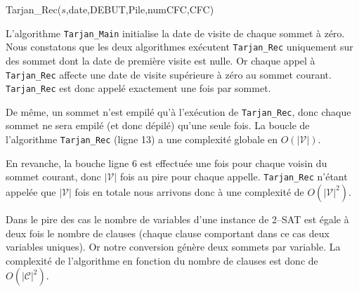 \begin{enumerate}[(a)]
\begin{algorithm}[H]
  \caption{Tarjan\_Rec($s$,date,DEBUT,Pile,numCFC,CFC)}
\end{algorithm}

L'algorithme \texttt{Tarjan\_Main} initialise la date de visite de chaque sommet à zéro. Nous constatons que les deux algorithmes exécutent \texttt{Tarjan\_Rec} uniquement sur des sommet dont la date de première visite est nulle. Or chaque appel à \texttt{Tarjan\_Rec} affecte une date de visite supérieure à zéro au sommet courant. \texttt{Tarjan\_Rec} est donc appelé exactement une fois par sommet.

De même, un sommet n'est empilé qu'à l'exécution de \texttt{Tarjan\_Rec}, donc chaque sommet ne sera empilé (et donc dépilé) qu'une seule fois. La boucle de l'algorithme \texttt{Tarjan\_Rec} (ligne 13) a une complexité globale en $O(|\mathcal{V}|)$.

En revanche, la bouche ligne 6 est effectuée une fois pour chaque voisin du sommet courant, donc $|\mathcal{V}|$ fois au pire pour chaque appelle. \texttt{Tarjan\_Rec} n'étant appelée que $|\mathcal{V}|$ fois en totale nous arrivons donc à une complexité de $O(|\mathcal{V}|^2)$.

Dans le pire des cas le nombre de variables d'une instance de 2--SAT est égale à deux fois le nombre de clauses (chaque clause comportant dans ce cas deux variables uniques). Or notre conversion génère deux sommets par variable. La complexité de l'algorithme en fonction du nombre de clauses est donc de $O(|\mathcal{C}|^2)$.


\end{enumerate}

